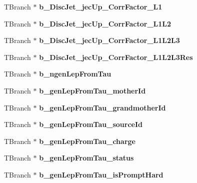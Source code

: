 \begin{DoxyCompactItemize}
T\+Branch $\ast$ {\bfseries b\+\_\+\+Disc\+Jet\+\_\+jec\+Up\+\_\+\+Corr\+Factor\+\_\+\+L1}
\item 
\hypertarget{classMiniTree_ab5b2595072779ea2b8c453dffcf60254}{}\label{classMiniTree_ab5b2595072779ea2b8c453dffcf60254} 
T\+Branch $\ast$ {\bfseries b\+\_\+\+Disc\+Jet\+\_\+jec\+Up\+\_\+\+Corr\+Factor\+\_\+\+L1\+L2}
\item 
\hypertarget{classMiniTree_ab4e271772f965c6490ebc58248418742}{}\label{classMiniTree_ab4e271772f965c6490ebc58248418742} 
T\+Branch $\ast$ {\bfseries b\+\_\+\+Disc\+Jet\+\_\+jec\+Up\+\_\+\+Corr\+Factor\+\_\+\+L1\+L2\+L3}
\item 
\hypertarget{classMiniTree_a867a800bfcb987aab1cc2fa2cacf45a6}{}\label{classMiniTree_a867a800bfcb987aab1cc2fa2cacf45a6} 
T\+Branch $\ast$ {\bfseries b\+\_\+\+Disc\+Jet\+\_\+jec\+Up\+\_\+\+Corr\+Factor\+\_\+\+L1\+L2\+L3\+Res}
\item 
\hypertarget{classMiniTree_ad76e37c7fb10fdc3a7fc9e29a5792950}{}\label{classMiniTree_ad76e37c7fb10fdc3a7fc9e29a5792950} 
T\+Branch $\ast$ {\bfseries b\+\_\+ngen\+Lep\+From\+Tau}
\item 
\hypertarget{classMiniTree_a269f8425fdb11a2d7efd9aa955a1aedd}{}\label{classMiniTree_a269f8425fdb11a2d7efd9aa955a1aedd} 
T\+Branch $\ast$ {\bfseries b\+\_\+gen\+Lep\+From\+Tau\+\_\+mother\+Id}
\item 
\hypertarget{classMiniTree_ab29cf76e2e0c4c7a0ea815d66b0a9788}{}\label{classMiniTree_ab29cf76e2e0c4c7a0ea815d66b0a9788} 
T\+Branch $\ast$ {\bfseries b\+\_\+gen\+Lep\+From\+Tau\+\_\+grandmother\+Id}
\item 
\hypertarget{classMiniTree_aa6abfb2371738a4b4237827b81a6fbaf}{}\label{classMiniTree_aa6abfb2371738a4b4237827b81a6fbaf} 
T\+Branch $\ast$ {\bfseries b\+\_\+gen\+Lep\+From\+Tau\+\_\+source\+Id}
\item 
\hypertarget{classMiniTree_a3099682c5bf4199af0ee1a5d0faf97e6}{}\label{classMiniTree_a3099682c5bf4199af0ee1a5d0faf97e6} 
T\+Branch $\ast$ {\bfseries b\+\_\+gen\+Lep\+From\+Tau\+\_\+charge}
\item 
\hypertarget{classMiniTree_a78e94e0934dd9e8dc329f76da6436ab8}{}\label{classMiniTree_a78e94e0934dd9e8dc329f76da6436ab8} 
T\+Branch $\ast$ {\bfseries b\+\_\+gen\+Lep\+From\+Tau\+\_\+status}
\item 
\hypertarget{classMiniTree_a51ef792c4901b368a52e3e388449bf5f}{}\label{classMiniTree_a51ef792c4901b368a52e3e388449bf5f} 
T\+Branch $\ast$ {\bfseries b\+\_\+gen\+Lep\+From\+Tau\+\_\+is\+Prompt\+Hard}
\item 
\hypertarget{classMiniTree_aa06a46f3e5aaa4dd68aecac7cc511d8f}{}\label{classMiniTree_aa06a46f3e5aaa4dd68aecac7cc511d8f} 

\end{DoxyCompactItemize}

